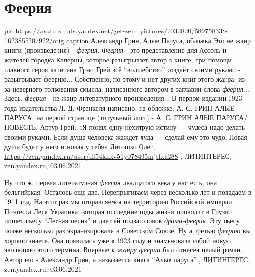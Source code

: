  
 
 
 
 
\chapter{Феерия}
\label{sec:slova.feeria}

\ifcmt
  pic https://avatars.mds.yandex.net/get-zen_pictures/2032820/589758338-1623855207922/orig
	caption Александр Грин, Алые Паруса, обложка
\fi
Это не жанр книги (произведения) - \emph{феерия}. \emph{Феерия} - это
представление для Ассоль и жителей городка Каперны, которое разыгрывает автор в
книге, при помощи главного героя капитана Грэя, Грей всё \enquote{волшебство}
создаёт своими руками - разыгрывает феерию... Собственно, по этому и нет других
книг этого жанра, из-за неверного толкования смысла, написанного автором в
заглавии слова \emph{феерия}...  Здесь, \emph{феерия} - не жанр литературного
произведения...  В первом издании 1923 года издательства Л. Д. Френкеля
написано, на обложке: А. С. ГРИН АЛЫЕ ПАРУСА, на первой странице (титульный
лист) - А. С. ГРИН АЛЫЕ ПАРУСА/ПОВЕСТЬ.  Артур Грэй: «Я понял одну нехитрую
истину — чудеса надо делать своими руками. Если душа человека жаждет чуда —
сделай ему это чудо. Новая душа будет у него и новая у тебя»
Литошко Олег, \url{https://zen.yandex.ru/user/df54khxv51y078405mjtfxa288}
, 
ЛИТИНТЕРЕС, zen.yandex.ru, 03.06.2021

Ну что ж, первая литературная \emph{феерия} двадцатого века у нас есть, она
бельгийская. Осталось еще две.  Перепрыгиваем через несколько лет и попадаем в
1911 год. На этот раз мы отправляемся на территорию Российской империи.
Поэтесса Леся Украинка, которая последние годы жизни проводит в Грузии, пишет
пьесу \enquote{Лесная песня} и дает ей подзаголовок \emph{драма-феерия}. Эту пьесу позже
несколько раз экранизировали в Советском Союзе.  Ну а третью \emph{феерию} вы хорошо
знаете. Она появилась уже в 1923 году и знаменовала собой новую эволюцию этого
термина. Впервые к \emph{жанру феерии} был отнесен целый роман. Автор его - Александр
Грин, а называется книга \enquote{Алые паруса}
, 
ЛИТИНТЕРЕС, zen.yandex.ru, 03.06.2021

